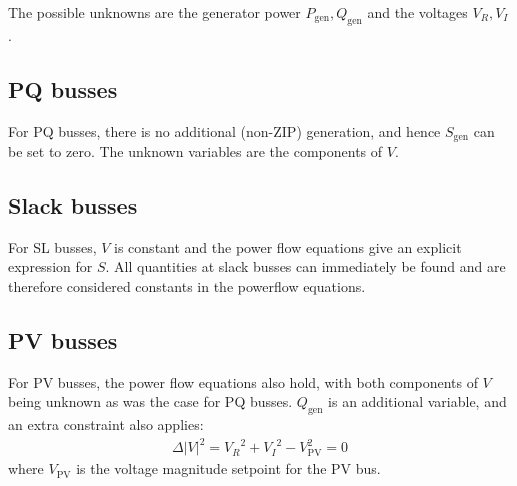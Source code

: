 \documentclass[11pt]{article}
\newcommand{\Vr}{{V_R}}
\newcommand{\Vi}{{V_I}}
\begin{document}
The possible unknowns are the generator power $P_\text{gen}, Q_\text{gen}$ and the voltages $\Vr, \Vi$.

\subsection{PQ busses}
For PQ busses, there is no additional (non-ZIP) generation, and hence $S_{\text{gen}}$ can be set to zero. The unknown variables are the components of $V$.
\subsection{Slack busses}
For SL busses, $V$ is constant and the power flow equations give an explicit expression for $S$. All quantities at slack busses can immediately be found and are therefore considered constants in the powerflow equations.
\subsection{PV busses}
For PV busses, the power flow equations also hold, with both components of $V$ being unknown as was the case for PQ busses. $Q_{\text{gen}}$ is an additional variable, and an extra constraint also applies:
\begin{align}
\Delta |V|^2 = \Vr^2 + \Vi^2 - V_\text{PV}^2 = 0
\label{EQ_POWERFLOW_PV_CONSTRAINT}
\end{align}
where $V_{\text{PV}}$ is the voltage magnitude setpoint for the PV bus.
\end{document}
